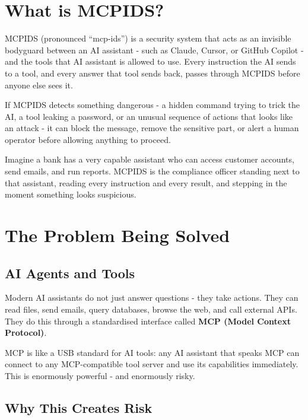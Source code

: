 \documentclass[12pt,a4paper]{report}
\begin{document}
\section{What is MCPIDS?}

MCPIDS (pronounced ``mcp-ids'') is a security system that acts as an invisible
bodyguard between an AI assistant - such as Claude, Cursor, or GitHub
Copilot - and the tools that AI assistant is allowed to use. Every instruction
the AI sends to a tool, and every answer that tool sends back, passes through
MCPIDS before anyone else sees it.

If MCPIDS detects something dangerous - a hidden command trying to trick the AI,
a tool leaking a password, or an unusual sequence of actions that looks like
an attack - it can block the message, remove the sensitive part, or alert a
human operator before allowing anything to proceed.

\begin{infobox}
Imagine a bank has a very capable assistant who can access customer accounts,
send emails, and run reports. MCPIDS is the compliance officer standing next to
that assistant, reading every instruction and every result, and stepping in the
moment something looks suspicious.
\end{infobox}

\section{The Problem Being Solved}

\subsection{AI Agents and Tools}

Modern AI assistants do not just answer questions - they take actions. They can
read files, send emails, query databases, browse the web, and call external
APIs. They do this through a standardised interface called
\textbf{MCP (Model Context Protocol)}.

MCP is like a USB standard for AI tools: any AI assistant that speaks MCP can
connect to any MCP-compatible tool server and use its capabilities immediately.
This is enormously powerful - and enormously risky.

\subsection{Why This Creates Risk}
\end{document}
